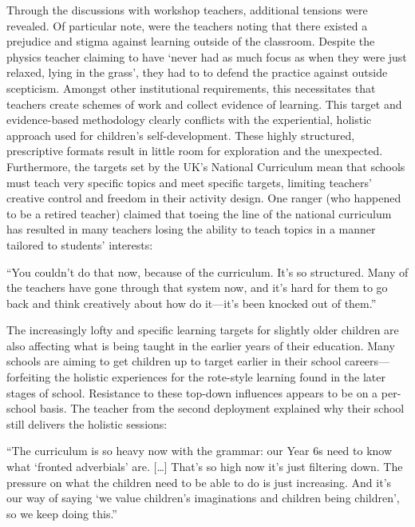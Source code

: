 Through the discussions with workshop teachers, additional tensions were revealed. Of particular note, were the teachers noting that there existed a prejudice and stigma against learning outside of the classroom. Despite the physics teacher claiming to have `never had as much focus as when they were just relaxed, lying in the grass', they had to to defend the practice against outside scepticism. Amongst other institutional requirements, this necessitates that teachers create schemes of work and collect evidence of learning. This target and evidence-based methodology clearly conflicts with the experiential, holistic approach used for children’s self-development. These highly structured, prescriptive formats result in little room for exploration and the unexpected. Furthermore, the targets set by the UK’s National Curriculum mean that schools must teach very specific topics and meet specific targets, limiting teachers’ creative control and freedom in their activity design. One ranger (who happened to be a retired teacher) claimed that toeing the line of the national curriculum has resulted in many teachers losing the ability to teach topics in a manner tailored to students’ interests:

\begin{displayquote}
“You couldn't do that now, because of the curriculum. It’s so structured. Many of the teachers have gone through that system now, and it’s hard for them to go back and think creatively about how do it---it’s been knocked out of them.”
\end{displayquote}

The increasingly lofty and specific learning targets for slightly older children are also affecting what is being taught in the earlier years of their education. Many schools are aiming to get children up to target earlier in their school careers---forfeiting the holistic experiences for the rote-style learning found in the later stages of school. Resistance to these top-down influences appears to be on a per-school basis. The teacher from the second deployment explained why their school still delivers the holistic sessions:

\begin{displayquote}
“The curriculum is so heavy now with the grammar: our Year 6s need to know what `fronted adverbials' are. […] That's so high now it’s just filtering down. The pressure on what the children need to be able to do is just increasing. And it's our way of saying `we value children’s imaginations and children being children', so we keep doing this.”
\end{displayquote}

